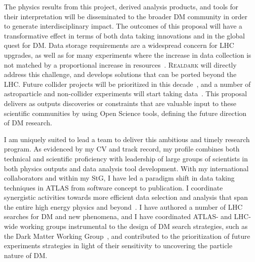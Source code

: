\documentclass[11pt,a4paper]{article}
\begin{document}
The physics results from this project, derived analysis products, and tools for their interpretation will be disseminated to the broader DM community in order to generate interdisciplinary impact.
The outcomes of this proposal will have a transformative effect in terms of both data taking innovations and in the global quest for DM. 
Data storage requirements are a widespread concern for LHC upgrades, as well as for many experiments where the increase in data collection is not matched by a proportional increase in resources~\cite{Alves:2017she,Allen:2018yvz}. 
\textsc{Realdark} will directly address this challenge, and develops solutions that can be ported beyond the LHC. 
Future collider projects will be prioritized in this decade~\cite{Strategy:2019vxc}, and a number of astroparticle and non-collider experiments will start taking data~\cite{APPECStrategy,Beacham:2019nyx}. 
This proposal delivers as outputs discoveries or constraints that are valuable input to these scientific communities by using Open Science tools, defining the future direction of DM research. 

I am uniquely suited to lead a team to deliver this ambitious and timely research program.  
As evidenced by my CV and track record, my profile combines both technical and scientific proficiency with leadership of large groups of scientists in both physics outputs and data analysis tool development. 
With my international collaborators and within my StG, I have led a paradigm shift in data taking techniques in ATLAS from software concept to publication. I coordinate synergistic activities towards more efficient data selection and analysis that span the entire high energy physics and beyond~\cite{Alves:2017she}. I have authored a number of LHC searches for DM and new phenomena, and I have coordinated ATLAS- and LHC-wide working groups instrumental to the design of DM search strategies, such as the Dark Matter Working Group~\cite{DMWGWebsite}, and contributed to the prioritization of future experiments strategies in light of their sensitivity to uncovering the particle nature of DM. 
\end{document}

